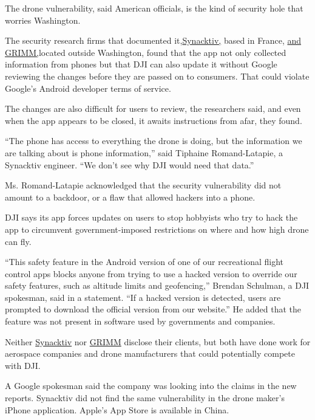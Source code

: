 The drone vulnerability, said American officials, is the kind of
security hole that worries Washington.

The security research firms that documented
it,\href{https://www.synacktiv.com/en/publications/dji-android-go-4-application-security-analysis.html}{Synacktiv,}
based in France,
\href{https://blog.grimm-co.com/2020/07/dji-privacy-analysis-validation.html}{and
GRIMM,}located outside Washington, found that the app not only collected
information from phones but that DJI can also update it without Google
reviewing the changes before they are passed on to consumers. That could
violate Google's Android developer terms of service.

The changes are also difficult for users to review, the researchers
said, and even when the app appears to be closed, it awaits instructions
from afar, they found.

``The phone has access to everything the drone is doing, but the
information we are talking about is phone information,'' said Tiphaine
Romand-Latapie, a Synacktiv engineer. ``We don't see why DJI would need
that data.''

Ms. Romand-Latapie acknowledged that the security vulnerability did not
amount to a backdoor, or a flaw that allowed hackers into a phone.

DJI says its app forces updates on users to stop hobbyists who try to
hack the app to circumvent government-imposed restrictions on where and
how high drone can fly.

``This safety feature in the Android version of one of our recreational
flight control apps blocks anyone from trying to use a hacked version to
override our safety features, such as altitude limits and geofencing,''
Brendan Schulman, a DJI spokesman, said in a statement. ``If a hacked
version is detected, users are prompted to download the official version
from our website.'' He added that the feature was not present in
software used by governments and companies.

Neither \href{https://www.synacktiv.com/en}{Synacktiv} nor
\href{https://www.grimm-co.com/}{GRIMM} disclose their clients, but both
have done work for aerospace companies and drone manufacturers that
could potentially compete with DJI.

A Google spokesman said the company was looking into the claims in the
new reports. Synacktiv did not find the same vulnerability in the drone
maker's iPhone application. Apple's App Store is available in China.

